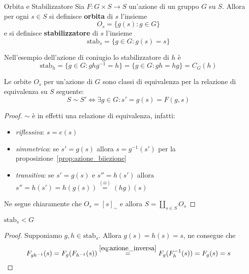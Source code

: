 \begin{definition}{Orbita e Stabilizzatore}
    Sia \(F : G \times  S \to S\) un'azione di un gruppo \(G\) su \(S\). Allora
    per ogni \(s \in S\) si definisce \textbf{orbita} di \(s\) l'insieme
    \[
        O_s = \{g{(s)} : g \in G\}
    \]
    e si definisce \textbf{stabilizzatore} di \(s\) l'insieme
    \[
        \text{stab}_s = \{g \in G : g{(s)} = s\}
    \]
\end{definition}
\begin{example}
    Nell'esempio dell'azione di coniugio lo stabilizzatore di \(h\) è
    \[
        \text{stab}_h = \{g \in G : ghg^{-1} = h\} = \{g \in G : gh = hg\} =
        C_G{(h)}
    \]
\end{example}

\begin{proposition}

Le orbite \(O_s\) per un'azione di \(G\) sono classi di equivalenza per la
relazione di equivalenza su \(S\) seguente:
\[
  S \sim S' \iff \exists g \in G : s' = g{(s)} = F{(g, s)}
\]
\end{proposition}
\begin{proof}
\(\sim\) è in effetti una relazione di equivalenza, infatti:
\begin{itemize}[label = --]
    \item \emph{riflessiva}: \(s = e{(s)}\)
    \item \emph{simmetrica}: se \(s' = g{(s)}\) allora \(s = g^{-1}{(s')}\)
        per la proposizione~\ref{prop:azione_biiezione}
    \item \emph{transitiva}: se \(s' = g{(s)}\) e \(s'' = h{(s')}\) allora
        \(s'' = h{(s')} = h{(g{(s)})} \overset{(ii)}{=} {(hg)}{(s)}\)
\end{itemize}

Ne segue chiaramente che \(O_s = {[s]}_\sim \) e allora \(\displaystyle S = \coprod_{s \in S}
O_s\) 
\end{proof}
\begin{proposition}
    \(\text{stab}_s < G\) 
\end{proposition}
\begin{proof}
    Supponiamo \(g, h \in \text{stab}_s\). Allora \(g{(s)} = h{(s)} = s\), ne
    consegue che
    \[
        F_{gh^{-1}} {(s)} = F_{g} {(F_{h^{-1}} {(s)})}
        \overset{\eqref{eq:azione_inversa}}{=} F_g {(F^{-1}_h{(s)})} =
        F_g {(s)} = s
    \]
\end{proof}






